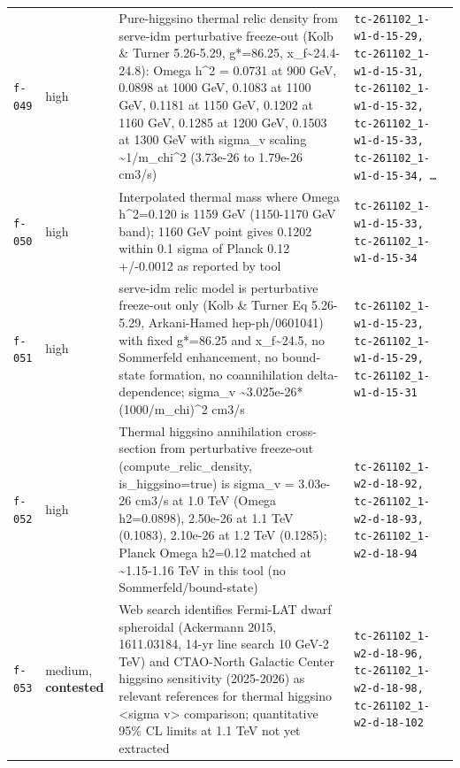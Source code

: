 \documentclass[11pt,a4paper]{article}
\begin{document}
\begin{longtable}{@{}p{}p{}p{}p{}@{}}
\texttt{f-049} & high & Pure-higgsino thermal relic density from serve-idm perturbative freeze-out (Kolb \& Turner 5.26-5.29, g*=86.25, x\_f\textasciitilde{}24.4-24.8): Omega h\textasciicircum{}2 = 0.0731 at 900 GeV, 0.0898 at 1000 GeV, 0.1083 at 1100 GeV, 0.1181 at 1150 GeV, 0.1202 at 1160 GeV, 0.1285 at 1200 GeV, 0.1503 at 1300 GeV with sigma\_v scaling \textasciitilde{}1/m\_chi\textasciicircum{}2 (3.73e-26 to 1.79e-26 cm3/s) & \texttt{tc-261102\_\allowbreak{}1-w1-d-15-29,\allowbreak{} tc-261102\_\allowbreak{}1-w1-d-15-31,\allowbreak{} tc-261102\_\allowbreak{}1-w1-d-15-32,\allowbreak{} tc-261102\_\allowbreak{}1-w1-d-15-33,\allowbreak{} tc-261102\_\allowbreak{}1-w1-d-15-34,\allowbreak{} \ldots{}\allowbreak{}} \\
\texttt{f-050} & high & Interpolated thermal mass where Omega h\textasciicircum{}2=0.120 is 1159 GeV (1150-1170 GeV band); 1160 GeV point gives 0.1202 within 0.1 sigma of Planck 0.12 +/-0.0012 as reported by tool & \texttt{tc-261102\_\allowbreak{}1-w1-d-15-33,\allowbreak{} tc-261102\_\allowbreak{}1-w1-d-15-34} \\
\texttt{f-051} & high & serve-idm relic model is perturbative freeze-out only (Kolb \& Turner Eq 5.26-5.29, Arkani-Hamed hep-ph/0601041) with fixed g*=86.25 and x\_f\textasciitilde{}24.5, no Sommerfeld enhancement, no bound-state formation, no coannihilation delta-dependence; sigma\_v \textasciitilde{}3.025e-26*(1000/m\_chi)\textasciicircum{}2 cm3/s & \texttt{tc-261102\_\allowbreak{}1-w1-d-15-23,\allowbreak{} tc-261102\_\allowbreak{}1-w1-d-15-29,\allowbreak{} tc-261102\_\allowbreak{}1-w1-d-15-31} \\
\texttt{f-052} & high & Thermal higgsino annihilation cross-section from perturbative freeze-out (compute\_relic\_density, is\_higgsino=true) is sigma\_v = 3.03e-26 cm3/s at 1.0 TeV (Omega h2=0.0898), 2.50e-26 at 1.1 TeV (0.1083), 2.10e-26 at 1.2 TeV (0.1285); Planck Omega h2=0.12 matched at \textasciitilde{}1.15-1.16 TeV in this tool (no Sommerfeld/bound-state) & \texttt{tc-261102\_\allowbreak{}1-w2-d-18-92,\allowbreak{} tc-261102\_\allowbreak{}1-w2-d-18-93,\allowbreak{} tc-261102\_\allowbreak{}1-w2-d-18-94} \\
\texttt{f-053} & medium, \textbf{contested} & Web search identifies Fermi-LAT dwarf spheroidal (Ackermann 2015, 1611.03184, 14-yr line search 10 GeV-2 TeV) and CTAO-North Galactic Center higgsino sensitivity (2025-2026) as relevant references for thermal higgsino \textless{}sigma v\textgreater{} comparison; quantitative 95\% CL limits at 1.1 TeV not yet extracted & \texttt{tc-261102\_\allowbreak{}1-w2-d-18-96,\allowbreak{} tc-261102\_\allowbreak{}1-w2-d-18-98,\allowbreak{} tc-261102\_\allowbreak{}1-w2-d-18-102} \\

\end{longtable}
\end{document}
